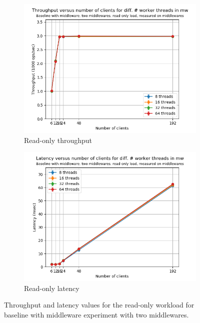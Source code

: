 \documentclass[11pt,a4paper]{article}
\begin{document}
\begin{figure}[h]
\centering
\begin{subfigure}{.5\textwidth}
  \centering
  \includegraphics[width=1.0\linewidth,trim={0px 0px 0px 0px},clip]{img/plot/mwb2-ro-tp_mw.png}
  \caption{Read-only throughput}
  \label{fig:mwb2-ro-tp_mw}
\end{subfigure}%
\begin{subfigure}{.5\textwidth}
  \centering
  \includegraphics[width=1.0\linewidth,trim={0px 0px 0px 0px},clip]{img/plot/mwb2-ro-lat_mw}
  \caption{Read-only latency}
  \label{fig:mwb2-ro-lat_mw}
\end{subfigure}
\caption{Throughput and latency values for the read-only workload for baseline with middleware experiment with two middlewares.}
\label{fig:mwb2-ro_mw}
\end{figure}
\end{document}
